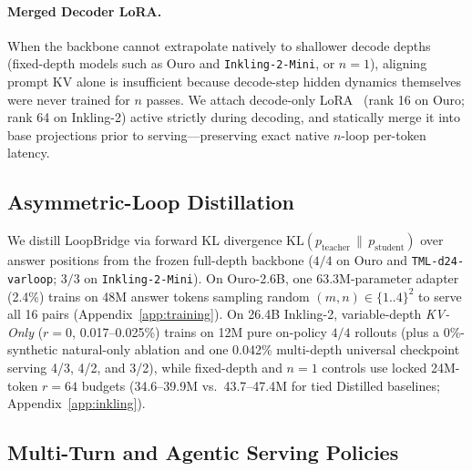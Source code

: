 \documentclass[11pt]{article}
\begin{document}
\paragraph{Merged Decoder LoRA.}
When the backbone cannot extrapolate natively to shallower decode depths (fixed-depth models such as Ouro and
\texttt{Inkling-2-Mini}, or $n{=}1$), aligning prompt KV alone is insufficient because decode-step hidden dynamics
themselves were never trained for $n$ passes. We attach decode-only LoRA~\citep{lora} (rank 16 on Ouro; rank 64 on
Inkling-2) active strictly during decoding, and statically merge it into base projections prior to serving---preserving
exact native $n$-loop per-token latency.

\subsection{Asymmetric-Loop Distillation}

We distill LoopBridge via forward KL divergence $\mathrm{KL}(p_{\text{teacher}} \,\|\, p_{\text{student}})$ over answer
positions from the frozen full-depth backbone ($4/4$ on Ouro and \texttt{TML-d24-varloop}; $3/3$ on
\texttt{Inkling-2-Mini}). On Ouro-2.6B, one 63.3M-parameter adapter (2.4\%) trains on 48M answer tokens sampling random
$(m,n)\in\{1..4\}^2$ to serve all 16 pairs (Appendix~\ref{app:training}). On 26.4B Inkling-2, variable-depth
\emph{KV-Only} ($r{=}0$, 0.017--0.025\%) trains on 12M pure on-policy $4/4$ rollouts (plus a 0\%-synthetic natural-only
ablation and one 0.042\% multi-depth universal checkpoint serving 4/3, 4/2, and 3/2), while fixed-depth and $n{=}1$
controls use locked 24M-token $r{=}64$ budgets (34.6--39.9M vs.\ 43.7--47.4M for tied Distilled baselines;
Appendix~\ref{app:inkling}).

\subsection{Multi-Turn and Agentic Serving Policies}
\label{sec:mt_method}
\end{document}
